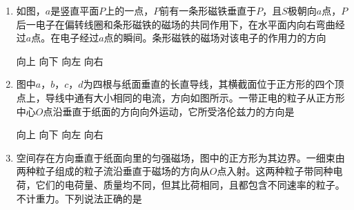\begin{enumerate}
\renewcommand{\labelenumi}{\arabic{enumi}.}
\item
{}
如图，$ a $是竖直平面$ P $上的一点，$ P $前有一条形磁铁垂直于$ P $，且$ S $极朝向$ a $点，$ P $后一电子在偏转线圈和条形磁铁的磁场的共同作用下，在水平面内向右弯曲经过$ a $点。在电子经过$ a $点的瞬间。条形磁铁的磁场对该电子的作用力的方向  
\begin{figure}[h!]
\centering

\end{figure}


\fourchoices
{向上}
{向下}
{向左}
{向右}





\item
{}
图中$ a $，$ b $，$ c $，$ d $为四根与纸面垂直的长直导线，其横截面位于正方形的四个顶点上，导线中通有大小相同的电流，方向如图所示。一带正电的粒子从正方形中心$ O $点沿垂直于纸面的方向向外运动，它所受洛伦兹力的方向是  

\begin{minipage}[h!]{0.7\linewidth}
\vspace{0.3em}
\fourchoices
{向上}
{向下}
{向左}
{向右}
\vspace{0.3em}
\end{minipage}
\hfill
\begin{minipage}[h!]{0.3\linewidth}
\flushright
\vspace{0.3em}

\vspace{0.3em}
\end{minipage}





\item
{}
空间存在方向垂直于纸面向里的匀强磁场，图中的正方形为其边界。一细束由两种粒子组成的粒子流沿垂直于磁场的方向从$ O $点入射。这两种粒子带同种电荷，它们的电荷量、质量均不同，但其比荷相同，且都包含不同速率的粒子。不计重力。下列说法正确的是  
\begin{figure}[h!]
\centering

\end{figure}



\end{enumerate}
